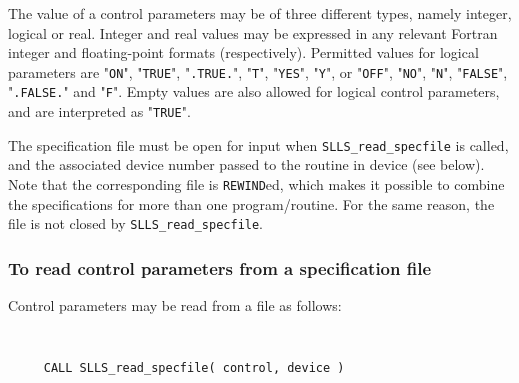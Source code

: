 \documentclass{galahad}
\newcommand{\packagename}{SLLS}
\begin{document}
The value of a control parameters may be of three different types, namely
integer, logical or real.
Integer and real values may be expressed in any relevant Fortran integer and
floating-point formats (respectively). Permitted values for logical
parameters are "{\tt ON}", "{\tt TRUE}", "{\tt .TRUE.}", "{\tt T}",
"{\tt YES}", "{\tt Y}", or "{\tt OFF}", "{\tt NO}",
"{\tt N}", "{\tt FALSE}", "{\tt .FALSE.}" and "{\tt F}".
Empty values are also allowed for
logical control parameters, and are interpreted as "{\tt TRUE}".

The specification file must be open for
input when {\tt \packagename\_read\_specfile}
is called, and the associated device number
passed to the routine in device (see below).
Note that the corresponding
file is {\tt REWIND}ed, which makes it possible to combine the specifications
for more than one program/routine.  For the same reason, the file is not
closed by {\tt \packagename\_read\_specfile}.

\subsubsection{To read control parameters from a specification file}
\label{readspec}

Control parameters may be read from a file as follows:
\hskip0.5in

\def\baselinestretch{0.8}
{\tt
\begin{verbatim}
     CALL SLLS_read_specfile( control, device )
\end{verbatim}
}
\def\baselinestretch{1.0}
\end{document}

